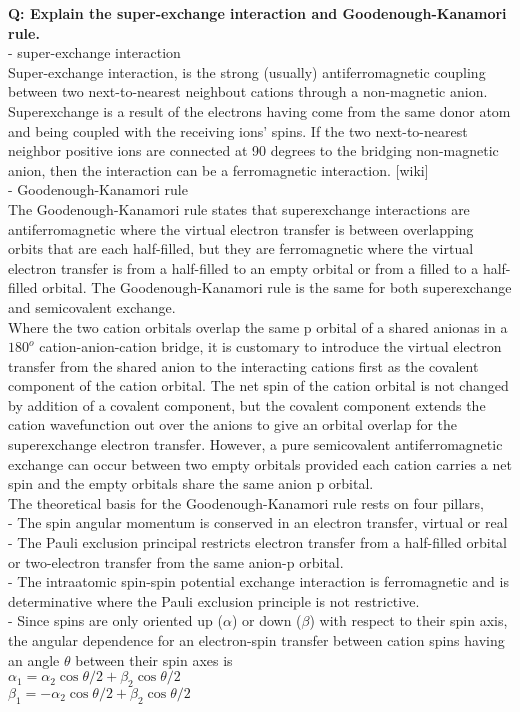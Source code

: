 \documentclass{article}
\begin{document}
\newpage
\noindent \textbf{Q: Explain the super-exchange interaction and Goodenough-Kanamori rule.}\\
\noindent - super-exchange interaction\\
\noindent Super-exchange interaction, is the strong (usually) antiferromagnetic coupling between two next-to-nearest neighbout cations through a non-magnetic anion. Superexchange is a result of the electrons having come from the same donor atom and being coupled with the receiving ions' spins. If the two next-to-nearest neighbor positive ions are connected at 90 degrees to the bridging non-magnetic anion, then the interaction can be a ferromagnetic interaction. [wiki]\\
\noindent - Goodenough-Kanamori rule\\
\noindent The Goodenough-Kanamori rule states that superexchange interactions are antiferromagnetic where the virtual electron transfer is between overlapping orbits that are each half-filled, but they are ferromagnetic where the virtual electron transfer is from a half-filled to an empty orbital or from a filled to a half-filled orbital. The Goodenough-Kanamori rule is the same for both superexchange and semicovalent exchange.\\
\noindent Where the two cation orbitals overlap the same p orbital of a shared anionas in a $180^{o}$ cation-anion-cation bridge, it is customary to introduce the virtual electron transfer from the shared anion to the interacting cations first as the covalent component of the cation orbital. The net spin of the cation orbital is not changed by addition of a covalent component, but the covalent component extends the cation wavefunction out over the anions to give an orbital overlap for the superexchange electron transfer. However, a pure semicovalent antiferromagnetic exchange can occur between two empty orbitals provided each cation carries a net spin and the empty orbitals share the same anion p orbital.\\
\noindent The theoretical basis for the Goodenough-Kanamori rule rests on four pillars,\\
\noindent - The spin angular momentum is conserved in an electron transfer, virtual or real\\
\noindent - The Pauli exclusion principal restricts electron transfer from a half-filled orbital or two-electron transfer from the same anion-p orbital.\\
\noindent - The intraatomic spin-spin potential exchange interaction is ferromagnetic and is determinative where the Pauli exclusion principle is not restrictive.\\
\noindent - Since spins are only oriented up ($\alpha$) or down ($\beta$) with respect to their spin axis, the angular dependence for an electron-spin transfer between cation spins having an angle $\theta$ between their spin axes is\\
\noindent  $\alpha_1=\alpha_2\cos{\theta/2}+\beta_2\cos{\theta/2}$\\
\noindent  $\beta_1=-\alpha_2\cos{\theta/2}+\beta_2\cos{\theta/2}$
\end{document}
